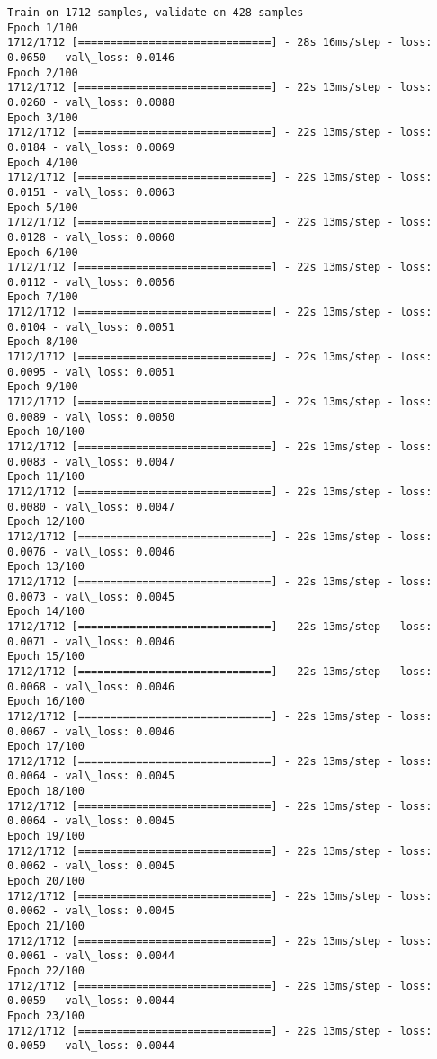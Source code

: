 \documentclass[11pt]{article}
\begin{document}
    \begin{Verbatim}[commandchars=\\\{\}]
Train on 1712 samples, validate on 428 samples
Epoch 1/100
1712/1712 [==============================] - 28s 16ms/step - loss: 0.0650 - val\_loss: 0.0146
Epoch 2/100
1712/1712 [==============================] - 22s 13ms/step - loss: 0.0260 - val\_loss: 0.0088
Epoch 3/100
1712/1712 [==============================] - 22s 13ms/step - loss: 0.0184 - val\_loss: 0.0069
Epoch 4/100
1712/1712 [==============================] - 22s 13ms/step - loss: 0.0151 - val\_loss: 0.0063
Epoch 5/100
1712/1712 [==============================] - 22s 13ms/step - loss: 0.0128 - val\_loss: 0.0060
Epoch 6/100
1712/1712 [==============================] - 22s 13ms/step - loss: 0.0112 - val\_loss: 0.0056
Epoch 7/100
1712/1712 [==============================] - 22s 13ms/step - loss: 0.0104 - val\_loss: 0.0051
Epoch 8/100
1712/1712 [==============================] - 22s 13ms/step - loss: 0.0095 - val\_loss: 0.0051
Epoch 9/100
1712/1712 [==============================] - 22s 13ms/step - loss: 0.0089 - val\_loss: 0.0050
Epoch 10/100
1712/1712 [==============================] - 22s 13ms/step - loss: 0.0083 - val\_loss: 0.0047
Epoch 11/100
1712/1712 [==============================] - 22s 13ms/step - loss: 0.0080 - val\_loss: 0.0047
Epoch 12/100
1712/1712 [==============================] - 22s 13ms/step - loss: 0.0076 - val\_loss: 0.0046
Epoch 13/100
1712/1712 [==============================] - 22s 13ms/step - loss: 0.0073 - val\_loss: 0.0045
Epoch 14/100
1712/1712 [==============================] - 22s 13ms/step - loss: 0.0071 - val\_loss: 0.0046
Epoch 15/100
1712/1712 [==============================] - 22s 13ms/step - loss: 0.0068 - val\_loss: 0.0046
Epoch 16/100
1712/1712 [==============================] - 22s 13ms/step - loss: 0.0067 - val\_loss: 0.0046
Epoch 17/100
1712/1712 [==============================] - 22s 13ms/step - loss: 0.0064 - val\_loss: 0.0045
Epoch 18/100
1712/1712 [==============================] - 22s 13ms/step - loss: 0.0064 - val\_loss: 0.0045
Epoch 19/100
1712/1712 [==============================] - 22s 13ms/step - loss: 0.0062 - val\_loss: 0.0045
Epoch 20/100
1712/1712 [==============================] - 22s 13ms/step - loss: 0.0062 - val\_loss: 0.0045
Epoch 21/100
1712/1712 [==============================] - 22s 13ms/step - loss: 0.0061 - val\_loss: 0.0044
Epoch 22/100
1712/1712 [==============================] - 22s 13ms/step - loss: 0.0059 - val\_loss: 0.0044
Epoch 23/100
1712/1712 [==============================] - 22s 13ms/step - loss: 0.0059 - val\_loss: 0.0044

\end{Verbatim}
\end{document}
